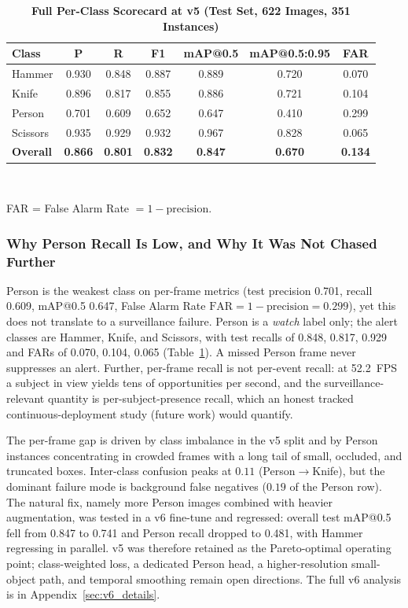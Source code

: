 \documentclass{ieeeaccess}
\begin{document}
\begin{table}[ht!]
\caption{\textbf{Full Per-Class Scorecard at v5 (Test Set, 622 Images, 351 Instances)}}
\label{tab:v5_full}
\setlength{\tabcolsep}{2pt}
\centering\footnotesize
\begin{tabular}{|l|c|c|c|c|c|c|}
\hline
\textbf{Class} & \textbf{P} & \textbf{R} & \textbf{F1} & \textbf{mAP{@}0.5} & \textbf{mAP{@}0.5:0.95} & \textbf{FAR} \\
\hline
Hammer   & 0.930 & 0.848 & 0.887 & 0.889 & 0.720 & 0.070 \\
Knife    & 0.896 & 0.817 & 0.855 & 0.886 & 0.721 & 0.104 \\
Person   & 0.701 & 0.609 & 0.652 & 0.647 & 0.410 & 0.299 \\
Scissors & 0.935 & 0.929 & 0.932 & 0.967 & 0.828 & 0.065 \\
\hline
\textbf{Overall} & \textbf{0.866} & \textbf{0.801} & \textbf{0.832} & \textbf{0.847} & \textbf{0.670} & \textbf{0.134} \\
\hline
\end{tabular}\\[2pt]
\raggedright\scriptsize FAR = False Alarm Rate $= 1 - \text{precision}$.
\end{table}

\subsubsection{Why Person Recall Is Low, and Why It Was Not Chased Further}
\label{sec:person_recall_discussion}
Person is the weakest class on per-frame metrics (test precision 0.701, recall 0.609, mAP{@}0.5 0.647, False Alarm Rate $\text{FAR}=1-\text{precision}=0.299$), yet this does not translate to a surveillance failure. Person is a \emph{watch} label only; the alert classes are Hammer, Knife, and Scissors, with test recalls of 0.848, 0.817, 0.929 and FARs of 0.070, 0.104, 0.065 (Table~\ref{tab:v5_full}). A missed Person frame never suppresses an alert. Further, per-frame recall is not per-event recall: at 52.2~FPS a subject in view yields tens of opportunities per second, and the surveillance-relevant quantity is per-subject-presence recall, which an honest tracked continuous-deployment study (future work) would quantify.

The per-frame gap is driven by class imbalance in the v5 split and by Person instances concentrating in crowded frames with a long tail of small, occluded, and truncated boxes. Inter-class confusion peaks at $0.11$ (Person$\rightarrow$Knife), but the dominant failure mode is background false negatives ($0.19$ of the Person row). The natural fix, namely more Person images combined with heavier augmentation, was tested in a v6 fine-tune and regressed: overall test mAP{@}0.5 fell from 0.847 to 0.741 and Person recall dropped to 0.481, with Hammer regressing in parallel. v5 was therefore retained as the Pareto-optimal operating point; class-weighted loss, a dedicated Person head, a higher-resolution small-object path, and temporal smoothing remain open directions. The full v6 analysis is in Appendix~\ref{sec:v6_details}.
\end{document}
